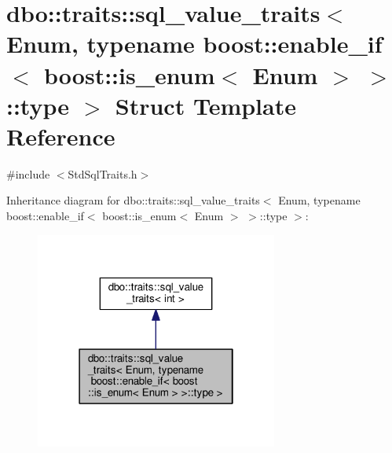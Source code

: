 \hypertarget{structdbo_1_1traits_1_1sql__value__traits_3_01_enum_00_01typename_01boost_1_1enable__if_3_01boosf3db7d431a3cc6684d99d55c76c69c74}{\section{dbo\+:\+:traits\+:\+:sql\+\_\+value\+\_\+traits$<$ Enum, typename boost\+:\+:enable\+\_\+if$<$ boost\+:\+:is\+\_\+enum$<$ Enum $>$ $>$\+:\+:type $>$ Struct Template Reference}
\label{structdbo_1_1traits_1_1sql__value__traits_3_01_enum_00_01typename_01boost_1_1enable__if_3_01boosf3db7d431a3cc6684d99d55c76c69c74}
}


{\ttfamily \#include $<$Std\+Sql\+Traits.\+h$>$}



Inheritance diagram for dbo\+:\+:traits\+:\+:sql\+\_\+value\+\_\+traits$<$ Enum, typename boost\+:\+:enable\+\_\+if$<$ boost\+:\+:is\+\_\+enum$<$ Enum $>$ $>$\+:\+:type $>$\+:\nopagebreak
\begin{figure}[H]
\begin{center}
\leavevmode
\includegraphics[width=226pt]{structdbo_1_1traits_1_1sql__value__traits_3_01_enum_00_01typename_01boost_1_1enable__if_3_01boos5008ffd71af7aaf3ac0f46b1624c2b91}
\end{center}
\end{figure}


